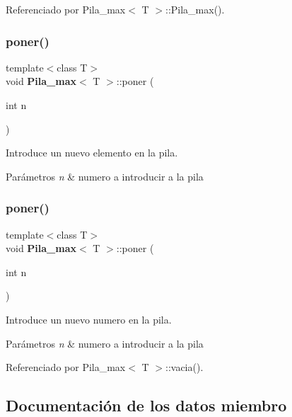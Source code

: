 Referenciado por Pila\+\_\+max$<$ T $>$\+::\+Pila\+\_\+max().

\label{classPila__max_ad47a205efb97c2e1c248d90026cc3b15} 
\subsubsection{poner()\hspace{0.1cm}{\footnotesize\ttfamily [1/2]}}
{\footnotesize\ttfamily template$<$class T$>$ \\
void {\bf Pila\+\_\+max}$<$ T $>$\+::poner (\begin{DoxyParamCaption}\item[{int}]{n }\end{DoxyParamCaption})}



Introduce un nuevo elemento en la pila. 


\begin{DoxyParams}{Parámetros}
{\em n} & numero a introducir a la pila \\
\hline
\end{DoxyParams}
\label{classPila__max_ad47a205efb97c2e1c248d90026cc3b15} 
\subsubsection{poner()\hspace{0.1cm}{\footnotesize\ttfamily [2/2]}}
{\footnotesize\ttfamily template$<$class T$>$ \\
void {\bf Pila\+\_\+max}$<$ T $>$\+::poner (\begin{DoxyParamCaption}\item[{int}]{n }\end{DoxyParamCaption})}



Introduce un nuevo numero en la pila. 


\begin{DoxyParams}{Parámetros}
{\em n} & numero a introducir a la pila \\
\hline
\end{DoxyParams}


Referenciado por Pila\+\_\+max$<$ T $>$\+::vacia().



\subsection{Documentación de los datos miembro}
\label{classPila__max_a3bd870960816b4138c7e63335455abf8} 

